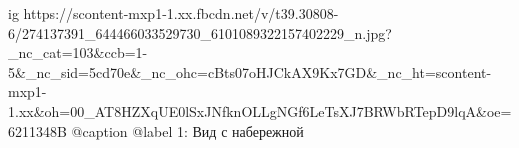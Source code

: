  
 
 
 
 

\ifcmt
  ig https://scontent-mxp1-1.xx.fbcdn.net/v/t39.30808-6/274137391_644466033529730_6101089322157402229_n.jpg?_nc_cat=103&ccb=1-5&_nc_sid=5cd70e&_nc_ohc=cBts07oHJCkAX9Kx7GD&_nc_ht=scontent-mxp1-1.xx&oh=00_AT8HZXqUE0lSxJNfknOLLgNGf6LeTsXJ7BRWbRTepD9lqA&oe=6211348B
  @caption @label 1: Вид с набережной
\fi
